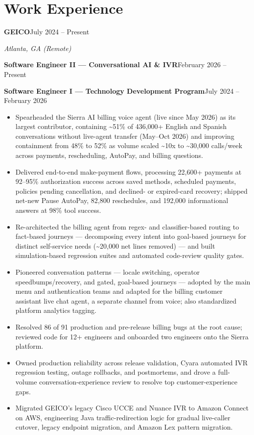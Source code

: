 \documentclass[10pt]{article}
\newcommand{\jobheader}[3]{%
  \noindent\textbf{#1}\hfill #2\par
  \noindent\textit{#3}\par\vspace{0pt}}
\newcommand{\roleline}[2]{%
  \noindent\textbf{#1}\hfill #2\par\vspace{0pt}}
\begin{document}
\section{Work Experience}
\jobheader{GEICO}{July 2024 -- Present}{Atlanta, GA (Remote)}
\roleline{Software Engineer II — Conversational AI \& IVR}{February 2026 -- Present}
\roleline{Software Engineer I — Technology Development Program}{July 2024 -- February 2026}
\begin{itemize}
  \item Spearheaded the Sierra AI billing voice agent (live since May 2026) as its largest contributor, containing \textasciitilde51\% of 436,000+ English and Spanish conversations without live-agent transfer (May--Oct 2026) and improving containment from 48\% to 52\% as volume scaled \textasciitilde10x to \textasciitilde30,000 calls/week across payments, rescheduling, AutoPay, and billing questions.
  \item Delivered end-to-end make-payment flows, processing 22,600+ payments at 92--95\% authorization success across saved methods, scheduled payments, policies pending cancellation, and declined- or expired-card recovery; shipped net-new Pause AutoPay, 82,800 reschedules, and 192,000 informational answers at 98\% tool success.
  \item Re-architected the billing agent from regex- and classifier-based routing to fact-based journeys — decomposing every intent into goal-based journeys for distinct self-service needs (\textasciitilde20,000 net lines removed) — and built simulation-based regression suites and automated code-review quality gates.
  \item Pioneered conversation patterns — locale switching, operator speedbumps/recovery, and gated, goal-based journeys — adopted by the main menu and authentication teams and adapted for the billing customer assistant live chat agent, a separate channel from voice; also standardized platform analytics tagging.
  \item Resolved 86 of 91 production and pre-release billing bugs at the root cause; reviewed code for 12+ engineers and onboarded two engineers onto the Sierra platform.
  \item Owned production reliability across release validation, Cyara automated IVR regression testing, outage rollbacks, and postmortems, and drove a full-volume conversation-experience review to resolve top customer-experience gaps.
  \item Migrated GEICO's legacy Cisco UCCE and Nuance IVR to Amazon Connect on AWS, engineering Java traffic-redirection logic for gradual live-caller cutover, legacy endpoint migration, and Amazon Lex pattern migration.

\end{itemize}
\end{document}
